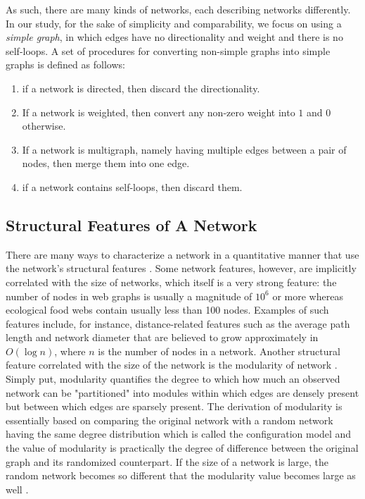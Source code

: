 \documentclass[..]{revtex4}
\begin{document}
	As such, there are many kinds of networks, each describing networks differently. In our study, for the sake of simplicity and comparability, we focus on using a \textit{simple graph}, in which edges have no directionality and weight and there is no self-loops. A set of procedures for converting non-simple graphs into simple graphs is defined as follows:
	
	\begin{enumerate}
		\item if a network is directed, then discard the directionality.
		\item If a network is weighted, then convert any non-zero weight into $1$ and $0$ otherwise.
		\item If a network is multigraph, namely having multiple edges between a pair of nodes, then merge them into one edge.
		\item if a network contains self-loops, then discard them.
	\end{enumerate}
	
	\subsection{Structural Features of A Network}
	There are many ways to characterize a network in a quantitative manner that use the network's structural features \cite{Newman:NetworksIntro,NetworkCharacterizationSurvey}. Some network features, however, are implicitly correlated with the size of networks, which itself is a very strong feature: the number of nodes in web graphs is usually a magnitude of $10^6$ or more whereas ecological food webs contain usually less than 100 nodes. Examples of such features include, for instance, distance-related features such as the average path length and network diameter that are believed to grow approximately in $O(\log n)$, where $n$ is the number of nodes in a network. Another structural feature correlated with the size of the network is the modularity of network \cite{Modularity1}. Simply put, modularity quantifies the degree to which how much an observed network can be "partitioned" into modules within which edges are densely present but between which edges are sparsely present. The derivation of modularity is essentially based on comparing the original network with a random network having the same degree distribution which is called the configuration model and the value of modularity is practically the degree of difference between the original graph and its randomized counterpart. If the size of a network is large, the random network becomes so different that the modularity value becomes large as well \cite{ResolutionLimit, ModularityLimit}.
	
\end{document}
